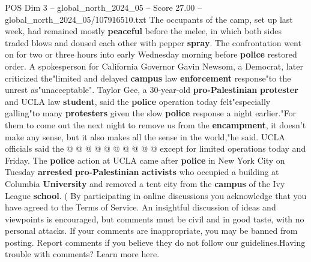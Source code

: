 \begin{textsample}{POS Dim 3 – global\_north\_2024\_05 – Score 27.00 – global\_north\_2024\_05/107916510.txt}
The occupants of the camp, set up last week, had remained mostly \textbf{peaceful} before the melee, in which both sides traded blows and doused each other with pepper \textbf{spray}.
The confrontation went on for two or three hours into early Wednesday morning before \textbf{police} restored order.
A spokesperson for California Governor Gavin Newsom, a Democrat, later criticized the"limited and delayed \textbf{campus} law \textbf{enforcement} response"to the unrest as"unacceptable".
Taylor Gee, a 30-year-old \textbf{pro-Palestinian} \textbf{protester} and UCLA law \textbf{student}, said the \textbf{police} operation today felt"especially galling"to many \textbf{protesters} given the slow \textbf{police} response a night earlier."For them to come out the next night to remove us from the \textbf{encampment}, it doesn't make any sense, but it also makes all the sense in the world,"he said.
UCLA officials said the @ @ @ @ @ @ @ @ @ @ except for limited operations today and Friday.
The \textbf{police} action at UCLA came after \textbf{police} in New York City on Tuesday \textbf{arrested} \textbf{pro-Palestinian} \textbf{activists} who occupied a building at Columbia \textbf{University} and removed a tent city from the \textbf{campus} of the Ivy League \textbf{school}. ( By participating in online discussions you acknowledge that you have agreed to the Terms of Service.
An insightful discussion of ideas and viewpoints is encouraged, but comments must be civil and in good taste, with no personal attacks.
If your comments are inappropriate, you may be banned from posting.
Report comments if you believe they do not follow our guidelines.Having trouble with comments?
Learn more here.

\end{textsample}
